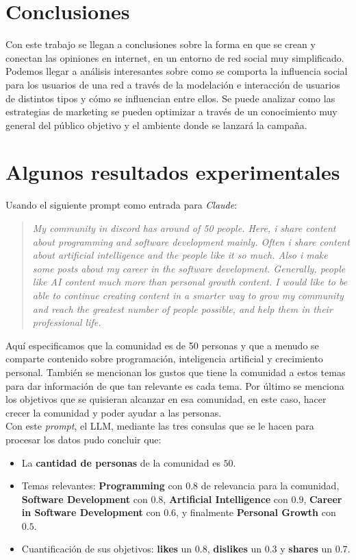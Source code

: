 \documentclass[acmtog]{acmart}
\begin{document}
\section{Conclusiones}
Con este trabajo se llegan a conclusiones sobre la forma en que se crean y conectan las opiniones en internet, en un entorno de red social muy simplificado. Podemos llegar a análisis interesantes sobre como se comporta la influencia social para los usuarios de una red a través de la modelación e interacción de usuarios de distintos tipos y cómo se influencian entre ellos. Se puede analizar como las estrategias de marketing se pueden optimizar a través de un conocimiento muy general del público objetivo y el ambiente donde se lanzará la campaña.

\section{Algunos resultados experimentales}

Usando el siguiente prompt como entrada para \textit{Claude}:

\begin{quote}
  \textit{My community in discord has around of 50 people. Here, i share content about programming and software development mainly. Often i share content about artificial intelligence and the people like it so much. Also i make some posts about my career in the software development. Generally, people like AI content much more than personal growth content. I would like to be able to continue creating content in a smarter way to grow my community and reach the greatest number of people possible, and help them in their professional life.}
\end{quote}

Aquí especificamos que la comunidad es de 50 personas y que a menudo se comparte contenido sobre programación, inteligencia artificial y crecimiento personal. También se mencionan los gustos que tiene la comunidad a estos temas para dar información de que tan relevante es cada tema.
Por último se menciona los objetivos que se quisieran alcanzar en esa comunidad, en este caso, hacer crecer la comunidad y poder ayudar a las personas.
\\
Con este \textit{prompt}, el LLM, mediante las tres consulas que se le hacen para procesar los datos pudo concluir que:

\begin{itemize}
  \item La \textbf{cantidad de personas} de la comunidad es $50$.
  \item Temas relevantes: \textbf{Programming} con $0.8$ de relevancia para la comunidad, \textbf{Software Development} con $0.8$, \textbf{Artificial Intelligence} con $0.9$, \textbf{Career in Software Development} con $0.6$, y finalmente \textbf{Personal Growth} con $0.5$.
  \item Cuantificación de sus objetivos: \textbf{likes} un $0.8$, \textbf{dislikes} un $0.3$ y \textbf{shares} un $0.7$.    
\end{itemize}
\end{document}
